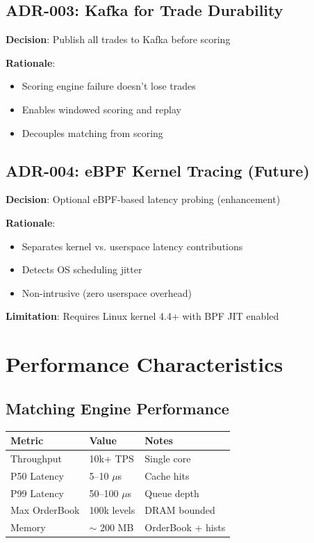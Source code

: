 \documentclass[10pt,a4paper,oneside]{report}
\begin{document}
\section{ADR-003: Kafka for Trade Durability}

\textbf{Decision}: Publish all trades to Kafka before scoring

\textbf{Rationale}:
\begin{itemize}
    \item Scoring engine failure doesn't lose trades
    \item Enables windowed scoring and replay
    \item Decouples matching from scoring
\end{itemize}

\section{ADR-004: eBPF Kernel Tracing (Future)}

\textbf{Decision}: Optional eBPF-based latency probing (enhancement)

\textbf{Rationale}:
\begin{itemize}
    \item Separates kernel vs. userspace latency contributions
    \item Detects OS scheduling jitter
    \item Non-intrusive (zero userspace overhead)
\end{itemize}

\textbf{Limitation}: Requires Linux kernel 4.4+ with BPF JIT enabled

\chapter{Performance Characteristics}

\section{Matching Engine Performance}

\begin{table}[H]\small
    \centering
    \begin{tabular}{lll}
    \toprule
    \textbf{Metric} & \textbf{Value} & \textbf{Notes} \\
    \midrule
    Throughput & 10k+ TPS & Single core \\
    P50 Latency & 5--10 $\mu$s & Cache hits \\
    P99 Latency & 50--100 $\mu$s & Queue depth \\
    Max OrderBook & 100k levels & DRAM bounded \\
    Memory & $\sim$ 200 MB & OrderBook + hists \\
    \bottomrule
    \end{tabular}
\end{table}
\end{document}
